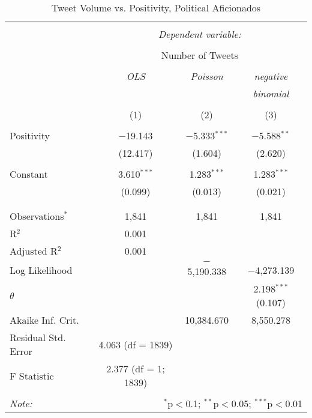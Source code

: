 \begin{table}[!htbp] \centering 
  \caption{Tweet Volume vs. Positivity, Political Aficionados} 
  \label{} 
    \begin{tabular}{@{\extracolsep{5pt}}lccc} 
    \\[-1.8ex]\hline 
    \hline \\[-1.8ex] 
     & \multicolumn{3}{c}{\textit{Dependent variable:}} \\ 
    \cline{2-4} 
    \\[-1.8ex] & \multicolumn{3}{c}{Number of Tweets} \\ 
    \\[-1.8ex] & \textit{OLS} & \textit{Poisson} & \textit{negative} \\ 
     & \textit{} & \textit{} & \textit{binomial} \\ 
    \\[-1.8ex] & (1) & (2) & (3)\\ 
    \hline \\[-1.8ex] 
     Positivity & $-$19.143 & $-$5.333$^{***}$ & $-$5.588$^{**}$ \\ 
      & (12.417) & (1.604) & (2.620) \\ 
      & & & \\ 
     Constant & 3.610$^{***}$ & 1.283$^{***}$ & 1.283$^{***}$ \\ 
      & (0.099) & (0.013) & (0.021) \\ 
      & & & \\ 
    \hline \\[-1.8ex] 
    Observations$^{*}$ & 1,841 & 1,841 & 1,841 \\ 
    R$^{2}$ & 0.001 &  &  \\ 
    Adjusted R$^{2}$ & 0.001 &  &  \\ 
    Log Likelihood &  & $-$5,190.338 & $-$4,273.139 \\ 
    $\theta$ &  &  & 2.198$^{***}$  (0.107) \\ 
    Akaike Inf. Crit. &  & 10,384.670 & 8,550.278 \\ 
    Residual Std. Error & 4.063 (df = 1839) &  &  \\ 
    F Statistic & 2.377 (df = 1; 1839) &  &  \\ 
    \hline 
    \hline \\[-1.8ex] 
    \textit{Note:}  & \multicolumn{3}{r}{$^{*}$p$<$0.1; $^{**}$p$<$0.05; $^{***}$p$<$0.01} \\ 
    \end{tabular} 
\end{table}
